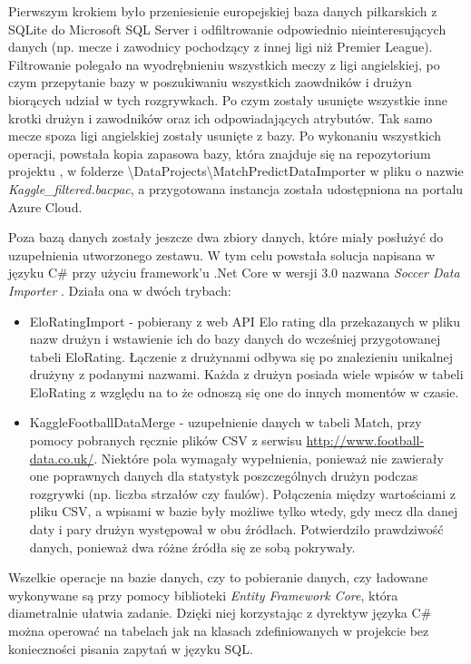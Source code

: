         Pierwszym krokiem było przeniesienie europejskiej baza danych piłkarskich z SQLite do Microsoft SQL Server i odfiltrowanie odpowiednio nieinteresujących danych (np. mecze i zawodnicy pochodzący z innej ligi niż Premier League). Filtrowanie polegało na wyodrębnieniu wszystkich meczy z ligi angielskiej, po czym przepytanie bazy w poszukiwaniu wszystkich zaowdników i drużyn biorących udział w tych rozgrywkach. Po czym zostały usunięte wszystkie inne krotki drużyn i zawodników oraz ich odpowiadających atrybutów. Tak samo mecze spoza ligi angielskiej zostały usunięte z bazy. Po wykonaniu wszystkich operacji, powstała kopia zapasowa bazy, która znajduje się na repozytorium projektu \cite{repo}, w folderze \textbackslash DataProjects\textbackslash MatchPredictDataImporter w pliku o nazwie \textit{Kaggle\_filtered.bacpac}, a przygotowana instancja została udostępniona na portalu Azure Cloud.
        
        Poza bazą danych zostały jeszcze dwa zbiory danych, które miały posłużyć do uzupełnienia utworzonego zestawu. W tym celu powstała solucja napisana w języku C\# przy użyciu framework'u  .Net Core w wersji 3.0 nazwana \textit{Soccer Data Importer} . Działa ona w dwóch trybach:
        \begin{itemize}
            \item EloRatingImport - pobierany z web API Elo rating dla przekazanych w pliku nazw drużyn i wstawienie ich do bazy danych do wcześniej przygotowanej tabeli EloRating. Łączenie z drużynami odbywa się po znalezieniu unikalnej drużyny z podanymi nazwami. Każda z drużyn posiada wiele wpisów w tabeli EloRating z względu na to że odnoszą się one do innych momentów w czasie. 
            \item KaggleFootballDataMerge - uzupełnienie danych w tabeli Match, przy pomocy pobranych ręcznie plików CSV z serwisu \url{http://www.football-data.co.uk/}. Niektóre pola wymagały wypełnienia, ponieważ nie zawierały one poprawnych danych dla statystyk poszczególnych drużyn podczas rozgrywki (np. liczba strzałów czy faulów). Połączenia między wartościami z pliku CSV, a wpisami w bazie były możliwe tylko wtedy, gdy mecz dla danej daty i pary drużyn występował w obu źródłach. Potwierdziło prawdziwość danych, ponieważ dwa różne źródła się ze sobą pokrywały.
        \end{itemize}
        
        Wszelkie operacje na bazie danych, czy to pobieranie danych, czy ładowane wykonywane są przy pomocy biblioteki \textit{Entity Framework Core}, która diametralnie ułatwia zadanie. Dzięki niej korzystając z dyrektyw języka C\# można operować na tabelach jak na klasach zdefiniowanych w projekcie bez konieczności pisania zapytań w języku SQL.
        
